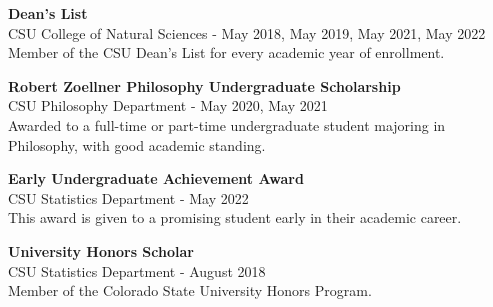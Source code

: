 \documentclass{article}
\newcommand{\award}[4]{
\begin{flushleft}
\textbf{#1}\\
#2 - #3\\
#4\\
\end{flushleft}
\leavevmode
}
\begin{document}
\award{Dean's List}{CSU College of Natural Sciences}{May 2018, May 2019, May 2021, May 2022}{
	Member of the CSU Dean's List for every academic year of enrollment.
}

\award{Robert Zoellner Philosophy Undergraduate Scholarship}{CSU Philosophy Department}{May 2020, May 2021}{
	Awarded to a full-time or part-time undergraduate student majoring in
	Philosophy, with good academic standing.
}

\award{Early Undergraduate Achievement Award}{CSU Statistics Department}{May 2022}{
	This award is given to a promising student early in their academic career.
}

\award{University Honors Scholar}{CSU Statistics Department}{August 2018}{
	Member of the Colorado State University Honors Program.
}
\end{document}
